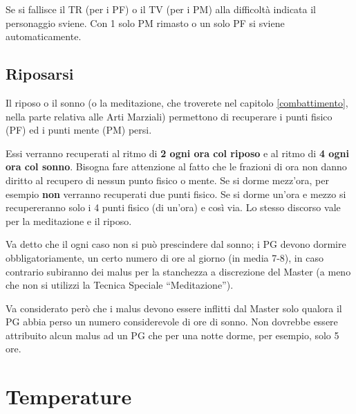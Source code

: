 Se si fallisce il TR (per i PF) o il TV (per i PM) alla difficolt\`a
indicata il personaggio sviene. Con 1 solo PM rimasto o un solo PF si
sviene automaticamente.


\subsection{Riposarsi} 

Il riposo o il sonno (o la meditazione, che troverete nel capitolo
\ref{combattimento}, nella parte relativa alle Arti Marziali)
permettono di recuperare i punti fisico (PF) ed i punti mente (PM)
persi.

Essi verranno recuperati al ritmo di \textbf{2 ogni ora col riposo} e
al ritmo di \textbf{4 ogni ora col sonno}. Bisogna fare attenzione al
fatto che le frazioni di ora non danno diritto al recupero di nessun
punto fisico o mente.  Se si dorme mezz'ora, per esempio \textbf{non}
verranno recuperati due punti fisico. Se si dorme un'ora e mezzo si
recupereranno solo i 4 punti fisico (di un'ora) e cos\`i via. Lo
stesso discorso vale per la meditazione e il riposo.

Va detto che il ogni caso non si pu\`o prescindere dal sonno; i PG
devono dormire obbligatoriamente, un certo numero di ore al giorno (in
media 7-8), in caso contrario subiranno dei malus per la stanchezza a
discrezione del Master (a meno che non si utilizzi la Tecnica Speciale
``Meditazione'').

Va considerato per\`o che i malus devono essere inflitti dal Master
solo qualora il PG abbia perso un numero considerevole di ore di
sonno.  Non dovrebbe essere attribuito alcun malus ad un PG che per
una notte dorme, per esempio, solo 5 ore.

\iffullversion
\section{Temperature}


